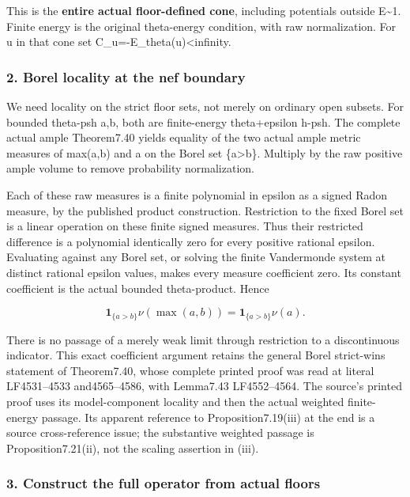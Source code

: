\documentclass[
]{article}
\begin{document}
This is the \textbf{entire actual floor-defined cone}, including
potentials outside E\textasciitilde1. Finite energy is the original
theta-energy condition, with raw normalization. For u in that cone set
C\_u=-E\_theta(u)\textless infinity.

\subsubsection{2. Borel locality at the nef
boundary}\label{borel-locality-at-the-nef-boundary}

We need locality on the strict floor sets, not merely on ordinary open
subsets. For bounded theta-psh a,b, both are finite-energy theta+epsilon
h-psh. The complete actual ample Theorem7.40 yields equality of the two
actual ample metric measures of max(a,b) and a on the Borel set
\{a\textgreater b\}. Multiply by the raw positive ample volume to remove
probability normalization.

Each of these raw measures is a finite polynomial in epsilon as a signed
Radon measure, by the published product construction. Restriction to the
fixed Borel set is a linear operation on these finite signed measures.
Thus their restricted difference is a polynomial identically zero for
every positive rational epsilon. Evaluating against any Borel set, or
solving the finite Vandermonde system at distinct rational epsilon
values, makes every measure coefficient zero. Its constant coefficient
is the actual bounded theta-product. Hence

\[\mathbf1_{\{a>b\}}\nu(\max(a,b))=
\mathbf1_{\{a>b\}}\nu(a).\]

There is no passage of a merely weak limit through restriction to a
discontinuous indicator. This exact coefficient argument retains the
general Borel strict-wins statement of Theorem7.40, whose complete
printed proof was read at literal LF4531--4533 and4565--4586, with
Lemma7.43 LF4552--4564. The source's printed proof uses its
model-component locality and then the actual weighted finite-energy
passage. Its apparent reference to Proposition7.19(iii) at the end is a
source cross-reference issue; the substantive weighted passage is
Proposition7.21(ii), not the scaling assertion in (iii).

\subsubsection{3. Construct the full operator from actual
floors}\label{construct-the-full-operator-from-actual-floors}
\end{document}

